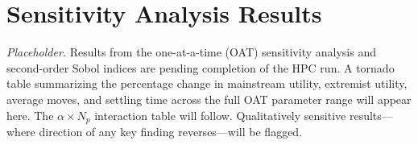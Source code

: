 \documentclass{article}
\begin{document}
\section{Sensitivity Analysis Results}
\label{app:sensitivity_results}

\textit{Placeholder.} Results from the one-at-a-time (OAT) sensitivity analysis and second-order Sobol indices are pending completion of the HPC run. A tornado table summarizing the percentage change in mainstream utility, extremist utility, average moves, and settling time across the full OAT parameter range will appear here. The $\alpha \times N_p$ interaction table will follow. Qualitatively sensitive results---where direction of any key finding reverses---will be flagged.
\end{document}
